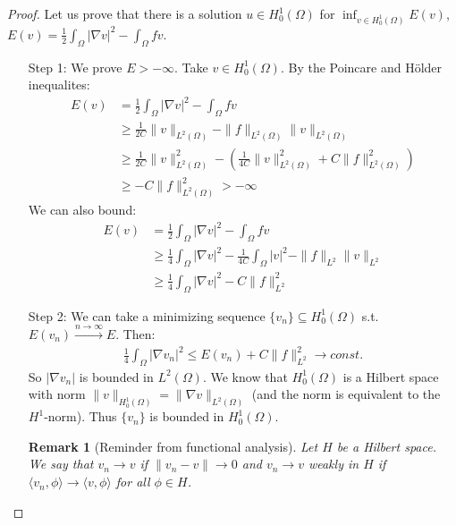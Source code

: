 \documentclass{report}
\theoremstyle{tommy}
\newtheorem{rem}[defn]{Remark}
\begin{document}
  \begin{proof}
    Let us prove that there is a solution \(u \in H_0^1(\Omega)\) for \(\inf_{v \in H_0^1(\Omega)} E(v)\), \(E(v) = \frac{1}{2} \int_\Omega|\nabla v|^2 - \int_\Omega f v\).
    \begin{itemize}
      \item[Step 1:] We prove \(E > - \infty\). Take \(v \in H_0^1(\Omega)\). By the Poincare and Hölder inequalites:
      \begin{align*}
        E(v) &= \frac{1}{2} \int_\Omega |\nabla v|^2 - \int_\Omega f v \\ 
        &\ge \frac{1}{2C} \|v\|_{L^2(\Omega)} - \|f\|_{L^2(\Omega)} \|v\|_{L^2(\Omega)} \\
        &\ge \frac{1}{2C} \|v\|^2_{L^2(\Omega)} - \left(\frac{1}{4C} \|v\|_{L^2(\Omega)}^2 + C \|f\|_{L^2(\Omega)}^2\right) \\
        &\ge - C \|f\|_{L^2(\Omega)}^2 > - \infty
      \end{align*}
      We can also bound:
      \begin{align*}
        E(v) &= \frac{1}{2} \int_\Omega|\nabla v|^2 - \int_\Omega f v \\
        &\ge \frac{1}{4} \int_\Omega |\nabla v|^2 - \frac{1}{4C} \int_\Omega |v|^2 - \|f\|_{L^2} \|v\|_{L^2} \\
        &\ge \frac{1}{4} \int_\Omega |\nabla v|^2 - C \|f\|_{L^2}^2
      \end{align*}
      \item[Step 2:] We can take a minimizing sequence \(\{v_n\} \subseteq H_0^1(\Omega)\) s.t. \(E(v_n) \xrightarrow{n \to \infty} E\). Then:
      \begin{align*}
        \frac{1}{4} \int_\Omega |\nabla v_n|^2 \le E(v_n) + C \|f\|_{L^2}^2 \longrightarrow const.
      \end{align*} 
      So \(|\nabla v_n|\) is bounded in \(L^2(\Omega)\). We know that \(H_0^1(\Omega)\) is a Hilbert space with norm \(\|v\|_{H_0^1(\Omega)} = \|\nabla v\|_{L^2(\Omega)}\) (and the norm is equivalent to the \(H^1\)-norm). Thus \(\{v_n\}\) is bounded in \(H_0^1(\Omega)\). 

      \begin{rem}[Reminder from functional analysis]
        Let \(H\) be a Hilbert space. We say that \(v_n \to v\) if \(\|v_n - v\| \to 0\) and \(v_n \to v\) weakly in \(H\) if \(\langle v_n, \phi \rangle \to \langle v, \phi \rangle\) for all \(\phi \in H\).
      \end{rem}


\end{itemize}
\end{proof}
\end{document}
